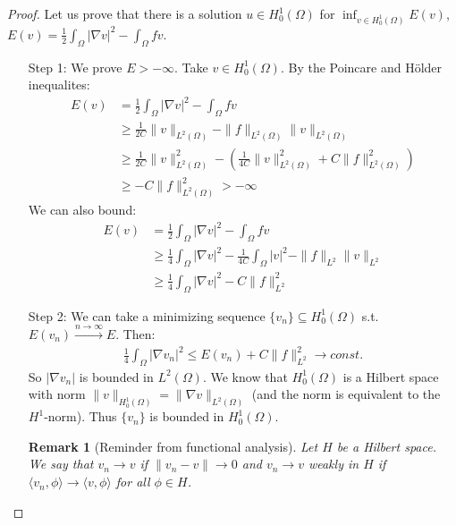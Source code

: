 \documentclass{report}
\theoremstyle{tommy}
\newtheorem{rem}[defn]{Remark}
\begin{document}
  \begin{proof}
    Let us prove that there is a solution \(u \in H_0^1(\Omega)\) for \(\inf_{v \in H_0^1(\Omega)} E(v)\), \(E(v) = \frac{1}{2} \int_\Omega|\nabla v|^2 - \int_\Omega f v\).
    \begin{itemize}
      \item[Step 1:] We prove \(E > - \infty\). Take \(v \in H_0^1(\Omega)\). By the Poincare and Hölder inequalites:
      \begin{align*}
        E(v) &= \frac{1}{2} \int_\Omega |\nabla v|^2 - \int_\Omega f v \\ 
        &\ge \frac{1}{2C} \|v\|_{L^2(\Omega)} - \|f\|_{L^2(\Omega)} \|v\|_{L^2(\Omega)} \\
        &\ge \frac{1}{2C} \|v\|^2_{L^2(\Omega)} - \left(\frac{1}{4C} \|v\|_{L^2(\Omega)}^2 + C \|f\|_{L^2(\Omega)}^2\right) \\
        &\ge - C \|f\|_{L^2(\Omega)}^2 > - \infty
      \end{align*}
      We can also bound:
      \begin{align*}
        E(v) &= \frac{1}{2} \int_\Omega|\nabla v|^2 - \int_\Omega f v \\
        &\ge \frac{1}{4} \int_\Omega |\nabla v|^2 - \frac{1}{4C} \int_\Omega |v|^2 - \|f\|_{L^2} \|v\|_{L^2} \\
        &\ge \frac{1}{4} \int_\Omega |\nabla v|^2 - C \|f\|_{L^2}^2
      \end{align*}
      \item[Step 2:] We can take a minimizing sequence \(\{v_n\} \subseteq H_0^1(\Omega)\) s.t. \(E(v_n) \xrightarrow{n \to \infty} E\). Then:
      \begin{align*}
        \frac{1}{4} \int_\Omega |\nabla v_n|^2 \le E(v_n) + C \|f\|_{L^2}^2 \longrightarrow const.
      \end{align*} 
      So \(|\nabla v_n|\) is bounded in \(L^2(\Omega)\). We know that \(H_0^1(\Omega)\) is a Hilbert space with norm \(\|v\|_{H_0^1(\Omega)} = \|\nabla v\|_{L^2(\Omega)}\) (and the norm is equivalent to the \(H^1\)-norm). Thus \(\{v_n\}\) is bounded in \(H_0^1(\Omega)\). 

      \begin{rem}[Reminder from functional analysis]
        Let \(H\) be a Hilbert space. We say that \(v_n \to v\) if \(\|v_n - v\| \to 0\) and \(v_n \to v\) weakly in \(H\) if \(\langle v_n, \phi \rangle \to \langle v, \phi \rangle\) for all \(\phi \in H\).
      \end{rem}


\end{itemize}
\end{proof}
\end{document}
